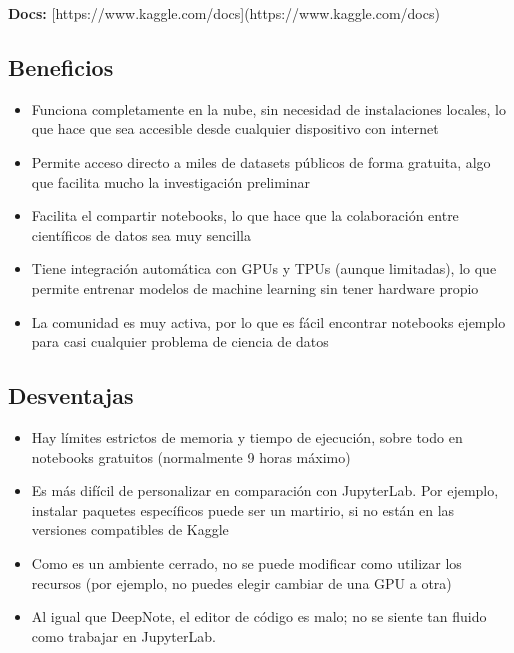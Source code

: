 \documentclass[a4paper,12pt]{article}
\begin{document}
\textbf{Docs:} [https://www.kaggle.com/docs](https://www.kaggle.com/docs)\cite{kaggle_docs}

\subsection{Beneficios}\cite{kaggle_features}
\begin{itemize}
    \item Funciona completamente en la nube, sin necesidad de instalaciones
        locales, lo que hace que sea accesible desde cualquier dispositivo con
        internet
    \item Permite acceso directo a miles de datasets públicos de forma gratuita,
        algo que facilita mucho la investigación preliminar
        \cite{kaggle_datasets}
    \item Facilita el compartir notebooks, lo que hace que la colaboración entre
        científicos de datos sea muy sencilla
    \item Tiene integración automática con GPUs y TPUs (aunque limitadas), lo
        que permite entrenar modelos de machine learning sin tener hardware
        propio
    \item La comunidad es muy activa, por lo que es fácil encontrar notebooks
        ejemplo para casi cualquier problema de ciencia de datos
\end{itemize}

\subsection{Desventajas}
\begin{itemize}
    \item Hay límites estrictos de memoria y tiempo de ejecución, sobre todo en
        notebooks gratuitos (normalmente 9 horas máximo)
        \cite{kaggle_limitations}
    \item Es más difícil de personalizar en comparación con JupyterLab.
        Por ejemplo, instalar paquetes específicos puede ser un martirio,
        si no están en las versiones compatibles de Kaggle
    \item Como es un ambiente cerrado, no se puede modificar como utilizar los
        recursos (por ejemplo, no puedes elegir cambiar de una GPU a otra)
    \item Al igual que DeepNote, el editor de código es malo; no se siente tan
        fluido como trabajar en JupyterLab.
\end{itemize}
\end{document}
